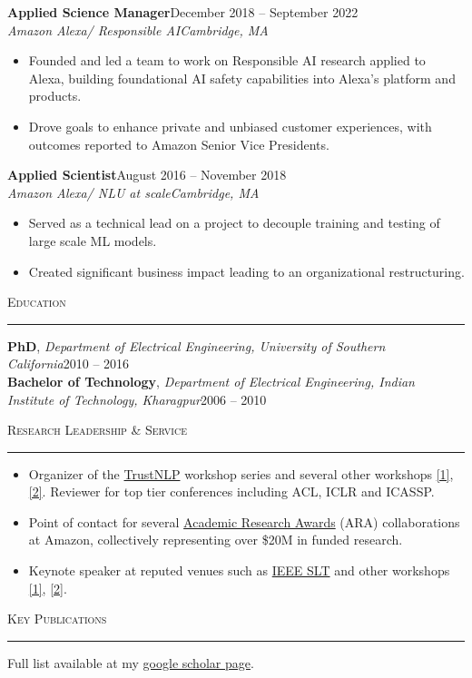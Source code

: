 \documentclass[11pt]{article}
\newcommand{\sectionheading}[1]{%
  \vspace{8pt}%
  {\large\scshape #1}\par\vspace{1pt}\hrule\vspace{3pt}%
}
\newcommand{\resumeentry}[5]{%
  \textbf{#1}\hfill #2\\
  \textit{#3}\hfill \textit{#4}
  \begin{itemize}
    #5
  \end{itemize}
  \vspace{2pt}
}
\begin{document}
\resumeentry
  {Applied Science Manager}
  {December 2018 -- September 2022}
  {Amazon Alexa/ Responsible AI}
  {Cambridge, MA}
  {\item Founded and led a team to work on Responsible AI research applied to Alexa, building foundational AI safety capabilities into Alexa's platform and products.
   \item Drove goals to enhance private and unbiased customer experiences, with outcomes reported to Amazon Senior Vice Presidents.}

\resumeentry
  {Applied Scientist}
  {August 2016 -- November 2018}
  {Amazon Alexa/ NLU at scale}
  {Cambridge, MA}
  {\item Served as a technical lead on a project to decouple training and testing of large scale ML models.
   \item Created significant business impact leading to an organizational restructuring.}

\sectionheading{Education}

\textbf{PhD}, \textit{Department of Electrical Engineering, University of Southern California}\hfill 2010 -- 2016\\
\textbf{Bachelor of Technology}, \textit{Department of Electrical Engineering, Indian Institute of Technology, Kharagpur}\hfill 2006 -- 2010

\sectionheading{Research Leadership \& Service}
\begin{itemize}
  \item Organizer of the \href{https://trustnlpworkshop.github.io/}{TrustNLP} workshop series and several other workshops \href{https://trustworthyspeechprocessing.github.io/}{[1]}, \href{https://llmunlearningsemeval2025.github.io/}{[2]}. Reviewer for top tier conferences including ACL, ICLR and ICASSP.
  \item Point of contact for several \href{https://www.amazon.science/research-awards}{Academic Research Awards} (ARA) collaborations at Amazon, collectively representing over \$20M in funded research.
  \item Keynote speaker at reputed venues such as \href{https://signalprocessingsociety.org/newsletter/2026/06/bridging-research-and-innovation-ieee-spoken-language-technology-slt-workshop}{IEEE SLT} and other workshops \href{https://advml-frontier.github.io/}{[1]}, \href{https://nlp4social.github.io/NSG-2026/}{[2]}.
\end{itemize}

\newpage

\sectionheading{Key Publications}
Full list available at my \href{https://scholar.google.com/citations?user=gSTLsFcAAAAJ}{google scholar page}.
\end{document}
